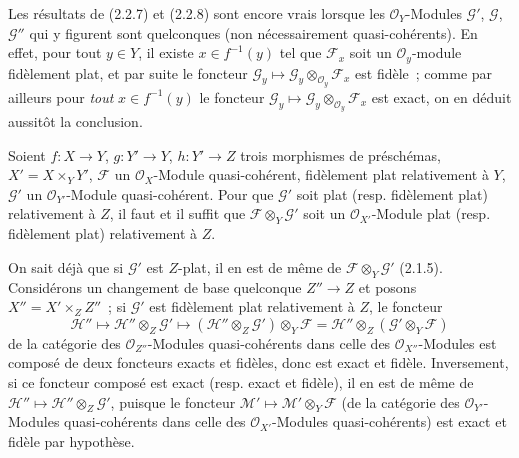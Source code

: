 \begin{remark}[2.2.9]
\label{IV.2.2.9-fr}
Les résultats de (2.2.7) et (2.2.8) sont encore vrais lorsque les
$\mathcal O_Y$-Modules $\mathscr G'$, $\mathscr G$, $\mathscr G''$ qui y
figurent sont quelconques (non nécessairement quasi-cohérents). En effet,
pour tout $y\in Y$, il existe $x\in f^{-1}(y)$ tel que $\mathscr F_x$ soit un
$\mathcal O_y$-module
fidèlement plat, et par suite le foncteur
$\mathscr G_y\mapsto\mathscr G_y\otimes_{\mathcal O_y}\mathscr F_x$ est
fidèle~; comme par ailleurs pour \emph{tout} $x\in f^{-1}(y)$ le foncteur
$\mathscr G_y\mapsto\mathscr G_y\otimes_{\mathcal O_y}\mathscr F_x$ est
exact, on en déduit aussitôt la conclusion.
\end{remark}

\begin{proposition}[2.2.10]
\label{IV.2.2.10-fr}
Soient $f:X\to Y$, $g:Y'\to Y$, $h:Y'\to Z$ trois morphismes de préschémas,
$X'=X\times_Y Y'$, $\mathscr F$ un $\mathcal O_X$-Module quasi-cohérent,
fidèlement plat relativement à $Y$, $\mathscr G'$ un
$\mathcal O_{Y'}$-Module quasi-cohérent. Pour que $\mathscr G'$ soit plat
(resp. fidèlement plat) relativement à $Z$, il faut et il suffit que
$\mathscr F\otimes_Y\mathscr G'$ soit un $\mathcal O_{X'}$-Module plat
(resp. fidèlement plat) relativement à $Z$.
\end{proposition}

On sait déjà que si $\mathscr G'$ est $Z$-plat, il en est de même de
$\mathscr F\otimes_Y\mathscr G'$ (2.1.5). Considérons un changement de base
quelconque $Z''\to Z$ et posons $X''=X'\times_Z Z''$~; si $\mathscr G'$ est
fidèlement plat relativement à $Z$, le foncteur
\begin{equation}
\tag{2.2.10.1}
\label{IV.2.2.10.1-fr}
\mathscr H''\mapsto\mathscr H''\otimes_Z\mathscr G'
\mapsto(\mathscr H''\otimes_Z\mathscr G')\otimes_Y\mathscr F
=\mathscr H''\otimes_Z(\mathscr G'\otimes_Y\mathscr F)
\end{equation}
de la catégorie des $\mathcal O_{Z''}$-Modules quasi-cohérents dans celle des
$\mathcal O_{X''}$-Modules est composé de deux foncteurs exacts et fidèles,
donc est exact et fidèle. Inversement, si ce foncteur composé est exact (resp.
exact et fidèle), il en est de même de
$\mathscr H''\mapsto\mathscr H''\otimes_Z\mathscr G'$, puisque le foncteur
$\mathscr M'\mapsto\mathscr M'\otimes_Y\mathscr F$ (de la catégorie des
$\mathcal O_{Y'}$-Modules quasi-cohérents dans celle des
$\mathcal O_{X'}$-Modules quasi-cohérents) est exact et fidèle par hypothèse.

